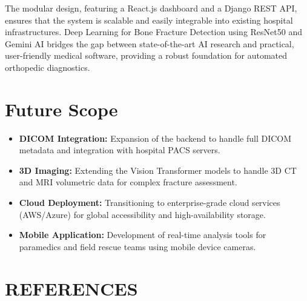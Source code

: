 \documentclass[a4paper,12pt]{report}
\begin{document}
    The modular design, featuring a React.js dashboard and a Django REST API, ensures that the system is scalable and easily integrable into existing hospital infrastructures. Deep Learning for Bone Fracture Detection using ResNet50 and Gemini AI bridges the gap between state-of-the-art AI research and practical, user-friendly medical software, providing a robust foundation for automated orthopedic diagnostics.

    \section{Future Scope}
    \begin{itemize}
        \item \textbf{DICOM Integration:} Expansion of the backend to handle full DICOM metadata and integration with hospital PACS servers.
        \item \textbf{3D Imaging:} Extending the Vision Transformer models to handle 3D CT and MRI volumetric data for complex fracture assessment.
        \item \textbf{Cloud Deployment:} Transitioning to enterprise-grade cloud services (AWS/Azure) for global accessibility and high-availability storage.
        \item \textbf{Mobile Application:} Development of real-time analysis tools for paramedics and field rescue teams using mobile device cameras.
    \end{itemize}


    \vspace{2em}
    \newpage

    \section{REFERENCES}
\end{document}
